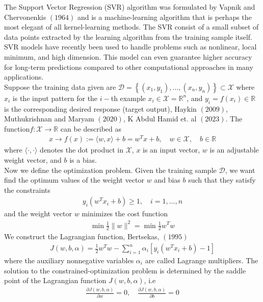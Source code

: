 The Support Vector Regression (SVR) algorithm was formulated by Vapnik and Chervonenkis $(1964)$
and is a machine-learning algorithm that is perhaps the most elegant of all kernel-learning 
methods. The SVR consist of a small subset of data points extracted by the learning algorithm
from the training sample itself. SVR models have recently been used to
handle problems such as nonlinear, local minimum, and high dimension. This model can even 
guarantee higher accuracy for long-term predictions compared to other computational approaches
in many applications.\\
 Suppose the training data given are $\mathcal{D}=\left\{(x_{1},y_{1}),\ldots,(x_{n},y_{n})\right\}\subset\mathcal{X}$
where $x_{i}$ is the input pattern for the $i-$th example $x_{i}\in \mathcal{X}= \mathbb{R}^{n}$,
and $y_{i}=f(x_{i})\in  \mathbb{R}$ is the corresponding desired response (target output),
Haykin $(2009)$, Muthukrishnan and Maryam $(2020)$, K Abdul Hamid et. al  $(2023)$.
The function$f:\mathcal{X}\rightarrow \mathbb{R}$ can be described as
\begin{align}
x\rightarrow f(x):=\langle w,x\rangle+b=w^{T}x + b,\quad w\in \mathcal{X},
\quad b\in \mathbb{R} \label{Equa:hyperplane}
\end{align}
 where $\langle \cdot,\cdot\rangle$ denotes the dot product in $\mathcal{X}$,
$x$ is an input vector, $w$ is an adjustable weight vector, and $b$ is a bias.\\
Now we define the optimization problem. Given the training sample $\mathcal{D}$, 
we want find the optimum values of the weight  vector $w$ and bias $b$ such that they
 satisfy the constraints
\begin{align}
y_{i}\left(w^{T}x_{i}+b\right) \geq 1,\quad i=1,\ldots,n
\end{align}
and the weight vector $w$ minimizes the cost function
 \begin{align}
	\min\frac{1}{2}\|w\|^{2} =\min\frac{1}{2}w^{T}w\label{Equa:convex}
\end{align}
We construct the Lagrangian function, Bertsekas, $(1995)$
\begin{align}
J(w,b,\alpha)=\frac{1}{2}w^{T}w-\sum_{i=1}^{n}\alpha_{i}
\left[y_{i}\left(w^{T}x_{i}+b\right) -1 \right] \label{Equa:conditions1}
\end{align}
where the auxiliary nonnegative variables $\alpha_{i}$ are called Lagrange multipliers.
The solution to the constrained-optimization problem is determined by the saddle point
of the Lagrangian function $J(w,b,\alpha)$, i.e
\begin{align}
\frac{\partial J(w,b,\alpha)}{\partial w}=0,\quad \frac{\partial J(w,b,\alpha)}{\partial b}=0
\label{Equa:conditions2}
\end{align}

